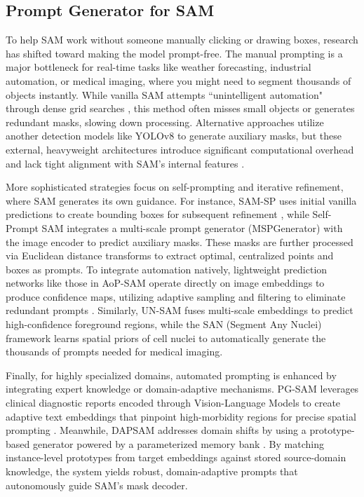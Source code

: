 \subsection{Prompt Generator for SAM}


To help SAM work without someone manually clicking or drawing boxes, research has shifted toward making the model prompt-free. The manual prompting is a major bottleneck for real-time tasks like weather forecasting, industrial automation, or medical imaging, where you might need to segment thousands of objects instantly. While vanilla SAM attempts ``unintelligent automation" through dense grid searches \cite{kirillov2023segment}, this method often misses small objects or generates redundant masks, slowing down processing. Alternative approaches utilize another detection models like YOLOv8 to generate auxiliary masks, but these external, heavyweight architectures introduce significant computational overhead and lack tight alignment with SAM’s internal features \cite{zhang2023personalize}.

More sophisticated strategies focus on self-prompting and iterative refinement, where SAM generates its own guidance. For instance, SAM-SP uses initial vanilla predictions to create bounding boxes for subsequent refinement \cite{zhou2024sam}, while Self-Prompt SAM integrates a multi-scale prompt generator (MSPGenerator) with the image encoder to predict auxiliary masks\cite{xie2025self}. These masks are further processed via Euclidean distance transforms to extract optimal, centralized points and boxes as prompts. To integrate automation natively, lightweight prediction networks like those in AoP-SAM operate directly on image embeddings to produce confidence maps, utilizing adaptive sampling and filtering to eliminate redundant prompts \cite{chen2025aop}. Similarly, UN-SAM fuses multi-scale embeddings to predict high-confidence foreground regions, while the SAN (Segment Any Nuclei) framework learns spatial priors of cell nuclei to automatically generate the thousands of prompts needed for medical imaging\cite{chen2024sam}.

Finally, for highly specialized domains, automated prompting is enhanced by integrating expert knowledge or domain-adaptive mechanisms. PG-SAM leverages clinical diagnostic reports encoded through Vision-Language Models to create adaptive text embeddings that pinpoint high-morbidity regions for precise spatial prompting \cite{wu2025multi}. Meanwhile, DAPSAM addresses domain shifts by using a prototype-based generator powered by a parameterized memory bank \cite{wei2024prompting}. By matching instance-level prototypes from target embeddings against stored source-domain knowledge, the system yields robust, domain-adaptive prompts that autonomously guide SAM’s mask decoder.




